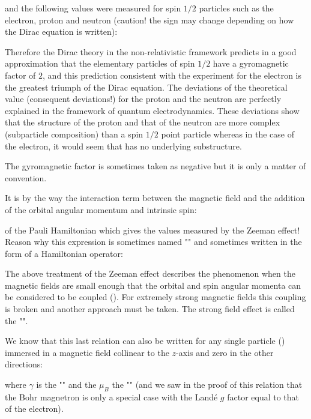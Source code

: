 	and the following values were measured for spin $1/2$ particles such as the electron, proton and neutron (caution! the sign may change depending on how the Dirac equation is written):
	
	Therefore the Dirac theory in the non-relativistic framework predicts in a good approximation that the elementary particles of spin $1/2$ have a gyromagnetic factor of $2$, and this prediction consistent with the experiment for the electron is the greatest triumph of the Dirac equation. The deviations of the theoretical value (consequent deviations!) for the proton and the neutron are perfectly explained in the framework of quantum electrodynamics. These deviations show that the structure of the proton and that of the neutron are more complex (subparticle composition) than a spin $1/2$ point particle whereas in the case of the electron, it would seem that has no underlying substructure.
	\begin{tcolorbox}[title=Remark,colframe=black,arc=10pt]
	The gyromagnetic factor is sometimes taken as negative but it is only a matter of convention.
	\end{tcolorbox}
	It is by the way the interaction term between the magnetic field and the addition of the orbital angular momentum and intrinsic spin:
	
	of the Pauli Hamiltonian which gives the values measured by the Zeeman effect! Reason why this expression is sometimes named "" and sometimes written in the form of a Hamiltonian operator:
	
	\begin{tcolorbox}[title=Remark,colframe=black,arc=10pt]
	The above treatment of the Zeeman effect describes the phenomenon when the magnetic fields are small enough that the orbital and spin angular momenta can be considered to be coupled (). For extremely strong magnetic fields this coupling is broken and another approach must be taken. The strong field effect is called the "".
	\end{tcolorbox}
	We know that this last relation can also be written for any single particle () immersed in a magnetic field collinear to the $z$-axis and zero in the other directions:
	
	where $\gamma$ is the "" and the $\mu_B$ the "" (and we saw in the proof of this relation that the Bohr magnetron is only a special case with the Landé $g$ factor equal to that of the electron).
	
